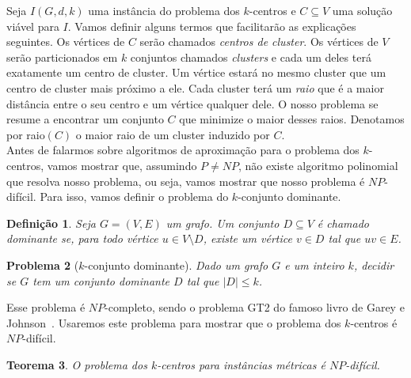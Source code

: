 \documentclass[12pt]{article}
\newtheorem{theorem}{Teorema}[section]
\newtheorem{definition}[theorem]{Definição}
\newtheorem{problem}[theorem]{Problema}
\newcommand{\NP}{\mathit{NP}}
\begin{document}
Seja $I(G,d,k)$ uma instância do problema dos $k$-centros e $C \subseteq V$ uma solução viável para $I$. Vamos definir alguns termos que facilitarão as explicações seguintes. Os vértices de $C$ serão chamados \emph{centros de cluster}. Os vértices de $V$ serão particionados em $k$ conjuntos chamados \emph{clusters} e cada um deles terá exatamente um centro de cluster. Um vértice estará no mesmo cluster que um centro de cluster mais próximo a ele. Cada cluster terá um \emph{raio} que é a maior distância entre o seu centro e um vértice qualquer dele. O nosso problema se resume a encontrar um conjunto $C$ que minimize o maior desses raios. Denotamos por raio$(C)$ o maior raio de um cluster induzido por $C$.\\
Antes de falarmos sobre algoritmos de aproximação para o problema dos $k$-centros, vamos mostrar que, assumindo $P\not=\NP$, não existe algoritmo polinomial que resolva nosso problema, ou seja, vamos mostrar que nosso problema é $\NP$-difícil. Para isso, vamos definir o problema do $k$-conjunto dominante.

\begin{definition}
    Seja $G = (V,E)$ um grafo. Um conjunto $D \subseteq V$ é chamado \emph{dominante} se, para todo vértice $u \in V \setminus D$, existe um vértice $v \in D$ tal que $uv \in E$.
\end{definition}

\begin{problem}[$k$-conjunto dominante]
    Dado um grafo $G$ e um inteiro $k$, decidir se $G$ tem um conjunto dominante $D$ tal que $|D| \leq k$.      
\end{problem}
Esse problema é $\NP$-completo, sendo o problema GT2 do famoso livro de Garey e Johnson~\cite{garey1979computers}. Usaremos este problema para mostrar que o problema dos $k$-centros é $\NP$-difícil.

\begin{theorem}\label{theorem:2.3}
    O problema dos $k$-centros para instâncias métricas é $\NP$-difícil.
\end{theorem}
\end{document}
